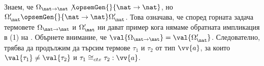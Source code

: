 Знаем, че $\Omega_{\nat\to\nat} \not\opsemGen{}{\nat\to\nat}$, но $\Omega'_{\nat} \opsemGen{}{\nat\to\nat} \Omega'_{\nat}$.
Това означава, че според горната задача термовете $\Omega_{\nat\to\nat}$ и $\Omega'_{\nat}$ ни дават пример кога нямаме обратната импликация в (1) на .
Обърнете внимание, че $\val{\Omega_{\nat\to\nat}} = \val{\Omega'_{\nat}}$.
Следователно, трябва да продължим да търсим термове $\tau_1$ и $\tau_2$ от тип $\vv{a}$, за които $\val{\tau_1} \neq \val{\tau_2}$
и $\tau_1 \cong_{ctx} \tau_2 : \vv{a}$.


